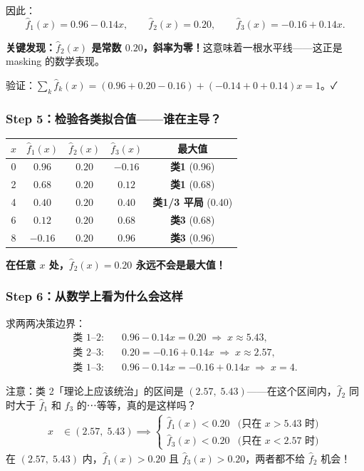 因此：
\[
\boxed{\hat{f}_1(x) = 0.96 - 0.14x},\qquad
\boxed{\hat{f}_2(x) = 0.20},\qquad
\boxed{\hat{f}_3(x) = -0.16 + 0.14x}.
\]

\textbf{关键发现：$\hat{f}_2(x)$ 是常数 $0.20$，斜率为零！}这意味着一根水平线——这正是 masking 的数学表现。

验证：$\sum_k \hat{f}_k(x) = (0.96+0.20-0.16) + (-0.14+0+0.14)x = 1$。✓

\subsubsection{Step 5：检验各类拟合值——谁在主导？}

\begin{center}
\begin{tabular}{c|c|c|c|c}
\hline
$x$ & $\hat{f}_1(x)$ & $\hat{f}_2(x)$ & $\hat{f}_3(x)$ & 最大值 \\
\hline
0 & $0.96$ & $0.20$ & $-0.16$ & \textbf{类1} (0.96) \\
2 & $0.68$ & $0.20$ & $0.12$ & \textbf{类1} (0.68) \\
4 & $0.40$ & $0.20$ & $0.40$ & \textbf{类1/3 平局} (0.40) \\
6 & $0.12$ & $0.20$ & $0.68$ & \textbf{类3} (0.68) \\
8 & $-0.16$ & $0.20$ & $0.96$ & \textbf{类3} (0.96) \\
\hline
\end{tabular}
\end{center}

\textbf{在任意 $x$ 处，$\hat{f}_2(x)=0.20$ 永远不会是最大值！}

\subsubsection{Step 6：从数学上看为什么会这样}

求两两决策边界：
\[
\begin{aligned}
\text{类 1--2:}&\quad 0.96 - 0.14x = 0.20 \;\Longrightarrow\; x \approx 5.43, \\
\text{类 2--3:}&\quad 0.20 = -0.16 + 0.14x \;\Longrightarrow\; x \approx 2.57, \\
\text{类 1--3:}&\quad 0.96 - 0.14x = -0.16 + 0.14x \;\Longrightarrow\; x = 4.
\end{aligned}
\]

注意：类 2「理论上应该统治」的区间是 $(2.57,\;5.43)$——在这个区间内，$\hat{f}_2$ 同时大于 $\hat{f}_1$ 和 $\hat{f}_3$ 的⋯等等，真的是这样吗？
\[
\begin{aligned}
x &\in (2.57,\;5.43) \implies \begin{cases}
\hat{f}_1(x) < 0.20 & \text{(只在 } x>5.43 \text{ 时)} \\
\hat{f}_3(x) < 0.20 & \text{(只在 } x<2.57 \text{ 时)}
\end{cases}
\end{aligned}
\]
在 $(2.57,\;5.43)$ 内，$\hat{f}_1(x) > 0.20$ 且 $\hat{f}_3(x) > 0.20$，两者都不给 $\hat{f}_2$ 机会！

